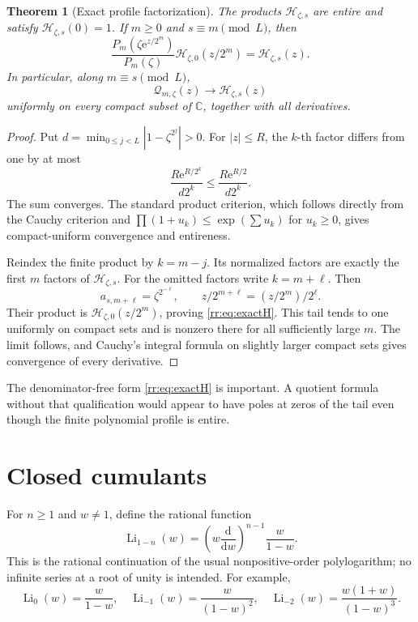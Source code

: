 \documentclass[11pt,a4paper,oneside,openany]{book}
\numberwithin{equation}{chapter}
\newtheorem{theorem}{Theorem}[chapter]
\theoremstyle{definition}
\theoremstyle{remark}
\newcommand{\C}{\mathbb C}
\newcommand{\e}{\mathrm e}
\DeclareMathOperator{\Li}{Li}
\newcommand{\Hp}{\mathcal H}
\newcommand{\Qp}{\mathcal Q}
\begin{document}
\begin{theorem}[Exact profile factorization]
\label{rr:thm:profile}
The products \(\Hp_{\zeta,s}\) are entire and satisfy \(\Hp_{\zeta,s}(0)=1\). If \(m\geq0\) and \(s\equiv m\pmod L\), then
\begin{equation}
 \boxed{\quad
 \frac{P_m(\zeta\e^{z/2^m})}{P_m(\zeta)}
 \Hp_{\zeta,0}(z/2^m)=\Hp_{\zeta,s}(z).
 \quad}
 \label{rr:eq:exactH}
\end{equation}
In particular, along \(m\equiv s\pmod L\),
\begin{equation}
 \Qp_{m,\zeta}(z)\longrightarrow\Hp_{\zeta,s}(z)
 \label{rr:eq:Hlimit}
\end{equation}
uniformly on every compact subset of \(\C\), together with all derivatives.
\end{theorem}
\begin{proof}
Put \(d=\min_{0\leq j<L}|1-\zeta^{2^j}|>0\). For \(|z|\leq R\), the \(k\)-th factor differs from one by at most
\begin{equation}
 \frac{R\e^{R/2^k}}{d2^k}\leq\frac{R\e^{R/2}}{d2^k}.
 \label{rr:eq:factorbound}
\end{equation}
The sum converges. The standard product criterion, which follows directly from the Cauchy criterion and \(\prod(1+u_k)\leq\exp(\sum u_k)\) for \(u_k\geq0\), gives compact-uniform convergence and entireness.

Reindex the finite product by \(k=m-j\). Its normalized factors are exactly the first \(m\) factors of \(\Hp_{\zeta,s}\). For the omitted factors write \(k=m+\ell\). Then
\[
 a_{s,m+\ell}=\zeta^{2^{-\ell}},\qquad
 z/2^{m+\ell}=(z/2^m)/2^\ell.
\]
Their product is \(\Hp_{\zeta,0}(z/2^m)\), proving \eqref{rr:eq:exactH}. This tail tends to one uniformly on compact sets and is nonzero there for all sufficiently large \(m\). The limit follows, and Cauchy's integral formula on slightly larger compact sets gives convergence of every derivative.
\end{proof}

The denominator-free form \eqref{rr:eq:exactH} is important. A quotient formula without that qualification would appear to have poles at zeros of the tail even though the finite polynomial profile is entire.

\section{Closed cumulants}
For \(n\geq1\) and \(w\neq1\), define the rational function
\begin{equation}
 \Li_{1-n}(w)=\left(w\frac{\mathrm d}{\mathrm dw}\right)^{n-1}
                  \frac{w}{1-w}.
 \label{rr:eq:Lirational}
\end{equation}
This is the rational continuation of the usual nonpositive-order polylogarithm; no infinite series at a root of unity is intended. For example,
\[
 \Li_0(w)=\frac{w}{1-w},\quad
 \Li_{-1}(w)=\frac{w}{(1-w)^2},\quad
 \Li_{-2}(w)=\frac{w(1+w)}{(1-w)^3}.
\]
\end{document}
